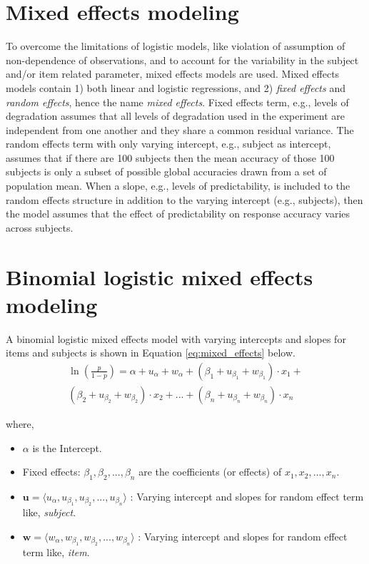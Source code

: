 \documentclass[a4paper, nobind]{templates/ociamthesis}
\providecommand{\tightlist}{%
  \setlength{\itemsep}{0pt}\setlength{\parskip}{0pt}}
\begin{document}
\hypertarget{mixed-effects-modeling}{%
\section{Mixed effects modeling}\label{mixed-effects-modeling}}

To overcome the limitations of logistic models, like violation of assumption of non-dependence of observations, and to account for the variability in the subject and/or item related parameter, mixed effects models are used.
Mixed effects models contain 1) both linear and logistic regressions, and 2) \emph{fixed effects} and \emph{random effects}, hence the name \emph{mixed effects}.
Fixed effects term, e.g., levels of degradation assumes that all levels of degradation used in the experiment are independent from one another and they share a common residual variance.
The random effects term with only varying intercept, e.g., subject as intercept, assumes that if there are 100 subjects then the mean accuracy of those 100 subjects is only a subset of possible global accuracies drawn from a set of population mean.
When a slope, e.g., levels of predictability, is included to the random effects structure in addition to the varying intercept (e.g., subjects), then the model assumes that the effect of predictability on response accuracy varies across subjects.

\hypertarget{binomial-logistic-mixed-effects-model}{%
\section{Binomial logistic mixed effects modeling}\label{binomial-logistic-mixed-effects-model}}

A binomial logistic mixed effects model with varying intercepts and slopes for items and subjects is shown in Equation \ref{eq:mixed_effects} below.
\begin{align} \label{eq:mixed_effects}
\ln (\frac{p}{1-p}) = \alpha + u_{\alpha} + w_{\alpha} +
                      (\beta_{1} + u_{\beta_{1}} + w_{\beta_{1}})\cdot {x_1} + \nonumber\\
                      (\beta_{2} + u_{\beta_{2}} + w_{\beta_{2}})\cdot {x_2} + ... +
                      (\beta_{n} + u_{\beta_{n}} + w_{\beta_{n}})\cdot {x_n} 
\end{align}

where,

\begin{itemize}
\tightlist
\item
  \(\alpha\) is the Intercept.
\item
  Fixed effects: \(\beta_{1}, \beta_{2}, ..., \beta_{n}\) are the coefficients (or effects) of \(x_1, x_2, ...,x_n\).
\item
  \(\boldsymbol{u} = \langle u_{\alpha}, u_{\beta_1}, u_{\beta_2}, ..., u_{\beta_n} \rangle\) : Varying intercept and slopes for random effect term like, \emph{subject}.
\item
  \(\boldsymbol{w} = \langle w_{\alpha}, w_{\beta_1}, w_{\beta_2}, ..., w_{\beta_n} \rangle\) : Varying intercept and slopes for random effect term like, \emph{item}.
\end{itemize}
\end{document}

